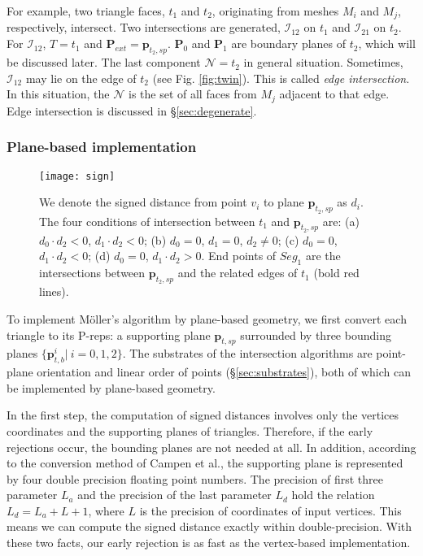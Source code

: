For example, two triangle faces, $t_1$ and $t_2$, originating from meshes $M_i$ and $M_j$, respectively, intersect. Two intersections are generated, ${\bm{\mathcal{I}}}_{12}$ on $t_1$ and ${\bm{\mathcal{I}}}_{21}$ on $t_2$.
For ${\bm{\mathcal{I}}}_{12}$, $T = t_1$ and $\bm{P}_{ext}=\bm{p}_{t_2, sp}$. $\bm{P}_0$ and $\bm{P}_1$ are boundary planes of $t_2$, which will be discussed later.
The last component $\mathcal{N}=t_2$ in general situation. Sometimes, ${\bm{\mathcal{I}}}_{12}$ may lie on the edge of $t_2$ (see Fig. \ref{fig:twin}). This is called \emph{edge intersection}. In this situation, the $\mathcal{N}$ is the set of all faces from $M_j$ adjacent to that edge. Edge intersection is discussed in \S\ref{sec:degenerate}.


\subsubsection{Plane-based implementation}

\label{sec:embed}
\begin{figure}[t]
\centering
\texttt{[image: sign]}
\caption{We denote the signed distance from point $v_i$ to plane $\bm{p}_{t_2, sp}$ as $d_i$. The four conditions of intersection between $t_1$ and $\bm{p}_{t_2, sp}$ are:
(a) $d_0\cdot d_2<0$, $d_1\cdot d_2<0$;
(b) $d_0=0$, $d_1=0$, $d_2\neq 0$;
(c) $d_0=0$, $d_1\cdot d_2<0$;
(d) $d_0=0$, $d_1\cdot d_2>0$. End points of $Seg_1$ are the intersections between $\bm{p}_{t_2, sp}$ and the related edges of $t_1$ (bold red lines).}
\label{fig:isect}
\end{figure}

To implement M\"{o}ller's algorithm by plane-based geometry, we first convert each triangle to its P-reps: a supporting plane $\bm{p}_{t, sp}$  surrounded by three bounding planes $\{\bm{p}_{t, b}^i|\ i = 0,1,2\}$. The substrates of the intersection algorithms are point-plane orientation \cite{bernstein2009fast} and linear order of points (\S\ref{sec:substrates}), both of which can be implemented by plane-based geometry.

In the first step, the computation of signed distances involves only the vertices coordinates and the supporting planes of triangles. Therefore, if the early rejections occur, the bounding planes are not needed at all. In addition, according to the conversion method of Campen et al.\cite{campen2010exact}, the supporting plane is represented by four double precision floating point numbers. The precision of first three parameter $L_a$ and the precision of the last parameter $L_d$ hold the relation $L_d = L_a + L + 1$, where $L$ is the precision of coordinates of input vertices. This means we can compute the signed distance exactly within double-precision. With these two facts, our early rejection is as fast as the vertex-based implementation.

